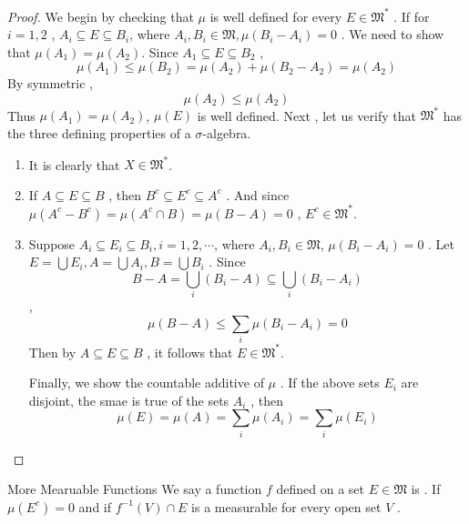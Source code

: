 \documentclass[../main.tex]{subfiles}
\begin{document}
\begin{proof}
   We begin by checking that \(  \mu   \) is well defined for every \(  E \in \mathfrak{M}^{*}  \) . If for \(  i= 1,2  \) ,   \(  A_{i}\subseteq E\subseteq B_{i}  \),   where \(  A_{i},B_{i}\in \mathfrak{M}, \mu \left( B_{i}-A_{i}\right)= 0 \) .     We need to show that \(  \mu \left( A_1 \right)= \mu \left( A_2 \right)    \). Since \(  A_1\subseteq E\subseteq B_2  \) ,  \[
   \mu \left( A_1 \right)\le \mu \left( B_2 \right)= \mu \left( A_2 \right)+ \mu \left( B_2-A_2 \right)= \mu \left( A_2 \right)     
   \] By symmetric , \[
   \mu \left( A_2 \right)\le \mu \left( A_2 \right)  
   \]Thus \(  \mu \left( A_1 \right)= \mu \left( A_2 \right)    \), \(  \mu \left( E \right)   \) is well defined. 
    Next , let us verify that \(  \mathfrak{M}^{*}  \) has the three defining properties of a \(   \sigma   \)-algebra. 
    \begin{enumerate}
        \item It is clearly that \(  X \in \mathfrak{M}^{*}  \). 
        \item If \(  A\subseteq E\subseteq B  \) , then \(  B^{c} \subseteq E^{c} \subseteq A^{c}   \) . And since \(  \mu \left( A^{c}-B^{c} \right)= \mu \left( A^{c}\cap B \right)= \mu \left( B-A \right)= 0     \) , \(  E^{c} \in \mathfrak{M}^{*}  \). 
        \item Suppose \(  A_{i}\subseteq E_{i}\subseteq B_{i} , i =  1,2,\cdots   \), where \(  A_{i},B_{i} \in \mathfrak{M}  \),    \(  \mu \left( B_{i}-A_{i} \right)= 0   \)       .  Let \(  E= \bigcup E_{i} ,A= \bigcup A_{i} ,B= \bigcup B_{i}  \) .  Since \[
        B-A= \bigcup _{i}\left( B_{i}-A \right)\subseteq \bigcup _{i} \left( B_{i}-A_{i} \right)  
        \], \[
        \mu \left( B-A \right)\le \sum _{i}\mu \left( B_{i}-A_{i} \right)= 0  
        \]Then by \(  A\subseteq E\subseteq B  \) , it follows that  \(  E \in \mathfrak{M}^{*}  \).   

        Finally, we show the countable additive of \(  \mu   \) .  If the above sets \(  E_{i}   \)   are disjoint, the smae is true of the sets \(  A_{i}  \) , then \[
        \mu \left( E \right)= \mu \left( A \right)= \sum _{i}\mu \left( A_{i} \right)= \sum _{i}\mu \left( E_{i} \right)    
        \] 
    \end{enumerate}
       
\end{proof}

\begin{definition}{More Mearuable Functions}{}
    We say a function \(  f  \) defined on a set \(  E \in \mathfrak{M}  \) is  .  If \(  \mu \left( E^{c} \right)= 0   \) and if \(  f^{-1} \left( V \right)\cap E   \)     is a measurable for every open set \(  V  \) . 
\end{definition}
\end{document}
